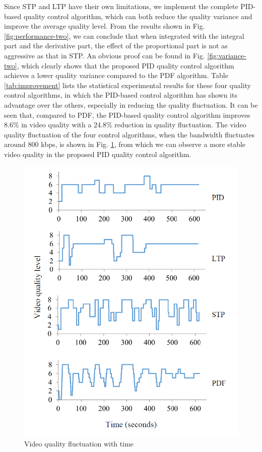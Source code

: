 \documentclass[journal]{IEEEtran}
\begin{document}
Since STP and LTP have their own limitations, we implement the complete PID-based quality control algorithm, which can both reduce the quality variance and improve the average quality level. From the results shown in Fig. \ref{fig:performance-two}, we can conclude that when integrated with the integral part and the derivative part, the effect of the proportional part is not as aggressive as that in STP. An obvious proof can be found in Fig. \ref{fig:variance-two}, which clearly shows that the proposed PID quality control algorithm achieves a lower quality variance compared to the PDF algorithm. Table \ref{tab:improvement} lists the statistical experimental results for these four quality control algorithms, in which the PID-based control algorithm has shown its advantage over the others, especially in reducing the quality fluctuation. It can be seen that, compared to PDF, the PID-based quality control algorithm improves 8.6\% in video quality with a 24.8\% reduction in quality fluctuation. The video quality fluctuation of the four control algorithms, when the bandwidth fluctuates around 800 kbps, is shown in Fig. \ref{fig:fluctuation}, from which we can observe a more stable video quality in the proposed PID quality control algorithm.

\begin{figure}
\centering
\includegraphics[width = 0.8\linewidth]{Fluctuation.png}
\caption{Video quality fluctuation with time \label{fig:fluctuation}}
\end{figure}
\end{document}
